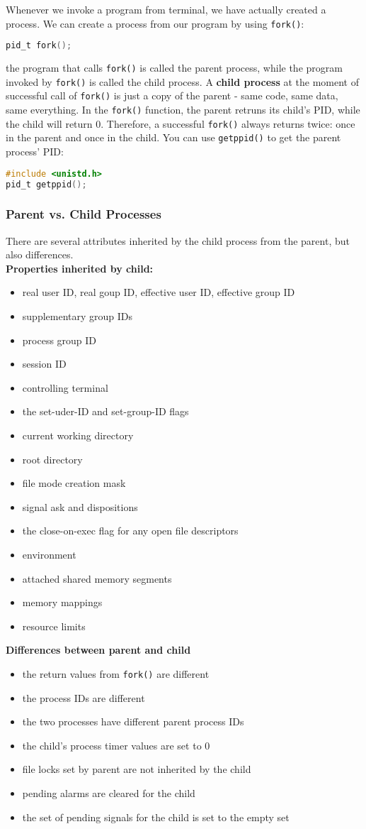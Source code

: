 \documentclass{article}
\newcommand{\bold}[1]{\textbf{#1}}
\renewcommand{\b}{\item[$\circ$]}
\newcommand{\newlist}{\begin{itemize}}
\renewcommand{\endlist}{\end{itemize}}
\newcommand{\code}[1]{\texttt{#1}}
\begin{document}
Whenever we invoke a program from terminal, we have actually created a process. We can create a process from our program by using \code{fork()}: 

\begin{lstlisting}[language=c]
pid_t fork();
\end{lstlisting}

\noindent the program that calls \code{fork()} is called the parent process, while the program invoked by \code{fork()} is called the child process. A \bold{child process} at the moment of successful call of \code{fork()} is just a copy of the parent - same code, same data, same everything. In the \code{fork()} function, the parent retruns its child's PID, while the child will return 0. Therefore, a successful \code{fork()} always returns twice: once in the parent and once in the child. You can use \code{getppid()} to get the parent process' PID: 

\begin{lstlisting}[language=c]
#include <unistd.h>
pid_t getppid();
\end{lstlisting}

\subsubsection{Parent vs. Child Processes}

There are several attributes inherited by the child process from the parent, but also differences. \\

\bold{Properties inherited by child:}

\newlist
\b real user ID, real goup ID, effective user ID, effective group ID
\b supplementary group IDs
\b process group ID
\b session ID
\b controlling terminal
\b the set-uder-ID and set-group-ID flags
\b current working directory
\b root directory
\b file mode creation mask
\b signal ask and dispositions
\b the close-on-exec flag for any open file descriptors
\b environment
\b attached shared memory segments
\b memory mappings
\b resource limits
\endlist

\bold{Differences between parent and child}

\newlist
\b the return values from \code{fork()} are different
\b the process IDs are different
\b the two processes have different parent process IDs
\b the child's process timer values are set to 0
\b file locks set by parent are not inherited by the child
\b pending alarms are cleared for the child
\b the set of pending signals for the child is set to the empty set
\endlist
\end{document}
